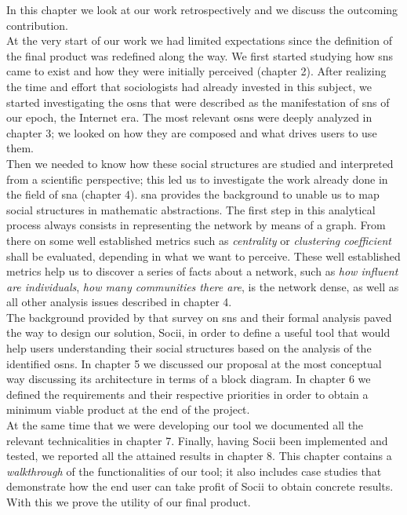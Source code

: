 In this chapter we look at our work retrospectively and we discuss the outcoming contribution.\\
\indent At the very start of our work we had limited expectations since the definition of the final product was redefined along the way. We first started studying how \glspl{sn} came to exist and how they were initially perceived (chapter 2). After realizing the time and effort that sociologists had already invested in this subject, we started investigating the \glspl{osn} that were described as the manifestation of \glspl{sn} of our epoch, the Internet era. The most relevant \glspl{osn} were deeply analyzed in chapter 3; we looked on how they are composed and what drives users to use them.\\
\indent Then we needed to know how these social structures are studied and interpreted from a scientific perspective; this led us to investigate the work already done in the field of \gls{sna} (chapter 4). \gls{sna} provides the background to unable us to map social structures in mathematic abstractions. The first step in this analytical process always consists in representing the network by means of a graph. From there on some well established metrics such as \emph{centrality} or \emph{clustering coefficient} shall be evaluated, depending in what we want to perceive. These well established metrics help us to discover a series of facts about a network, such as \emph{how influent are individuals}, \emph{how many communities there are}, is the network dense, as well as all other analysis issues described in chapter 4.\\
\indent The background provided by that survey on \glspl{sn} and their formal analysis paved the way to design our solution, Socii, in order to define a useful tool that would help users understanding their social structures based on the analysis of the identified \glspl{osn}. In chapter 5 we discussed our proposal at the most conceptual way discussing its architecture in terms of a block diagram. In chapter 6 we defined the requirements and their respective priorities in order to obtain a minimum viable product at the end of the project.\\
\indent At the same time that we were developing our tool we documented all the relevant technicalities in chapter 7. Finally, having Socii been implemented and tested, we reported all the attained results in chapter 8. This chapter contains a \textit{walkthrough} of the functionalities of our tool; it also includes case studies that demonstrate how the end user can take profit of Socii to obtain concrete results. With this we prove the utility of our final product.

